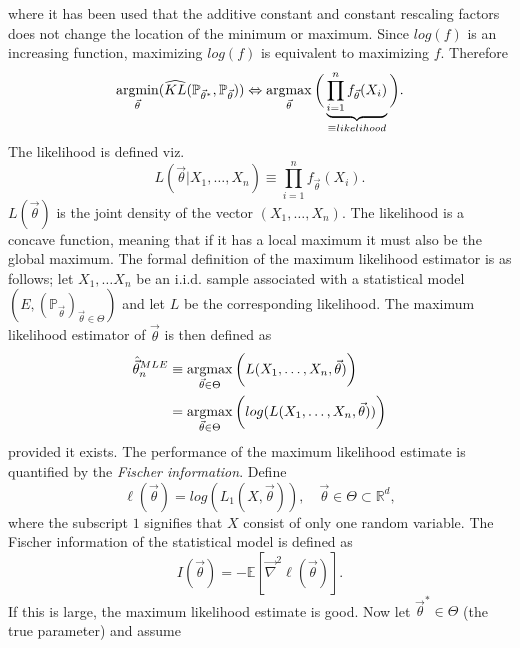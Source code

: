 where it has been used that the additive constant and constant rescaling factors does not change the location of the minimum or maximum. Since $log(f)$ is an increasing function, maximizing $log(f)$ is equivalent to maximizing $f$. Therefore
\begin{equation}
	\begin{split}
		\operatorname*{argmin}_{\vec{\theta}}(\widehat{KL}(\mathbb{P}_{\vec{\theta}^*},\mathbb{P}_{\vec{\theta}}))\Leftrightarrow \operatorname*{argmax}_{\vec{\theta}}\bigg(\underbrace{\prod_{i=1}^nf_{\vec{\theta}}(X_i)}_{\equiv likelihood}\bigg).\\
	\end{split}
\end{equation}
The likelihood is defined viz.
\begin{equation}
	L(\vec{\theta}|X_1,\dots,X_n)\equiv\prod_{i=1}^nf_{\vec{\theta}}(X_i).
	\label{ll}
\end{equation}
$L(\vec{\theta})$ is the joint density of the vector $(X_1,\dots, X_n)$. The likelihood is a concave function, meaning that if it has a local maximum it must also be the global maximum. The formal definition of the maximum likelihood estimator is as follows; let $X_1,\dots X_n$ be an i.i.d. sample associated with a statistical model $(E,(\mathbb{P}_{\vec{\theta}})_{\vec{\theta}\in \Theta})$ and let $L$ be the corresponding likelihood. The maximum likelihood estimator of $\vec{\theta}$ is then defined as
\begin{equation}
	\begin{split}
		\hat{\vec{\theta}}^{MLE}_n&\equiv \operatorname*{argmax}_{\vec{\theta}\in \Theta}\bigg(L(X_1,\dots, X_n,\vec{\theta})\bigg)\\
		&= \operatorname*{argmax}_{\vec{\theta}\in \Theta}\bigg(log(L(X_1,\dots, X_n,\vec{\theta}))\bigg)
	\end{split}
\end{equation}
provided it exists. The performance of the maximum likelihood estimate is quantified by the \emph{Fischer information}. Define
\begin{equation}
	\ell(\vec{\theta})=log(L_1(X,\vec{\theta})), \quad \vec{\theta}\in\Theta\subset \mathbb{R}^d,
\end{equation}
where the subscript $1$ signifies that $X$ consist of only one random variable. The Fischer information of the statistical model is defined as
\begin{equation}
	I(\vec{\theta})=-\mathbb{E}[\vec{\nabla}^2\ell(\vec{\theta})].
\end{equation}
If this is large, the maximum likelihood estimate is good. Now let $\vec{\theta}^*\in \Theta$ (the true parameter) and assume
